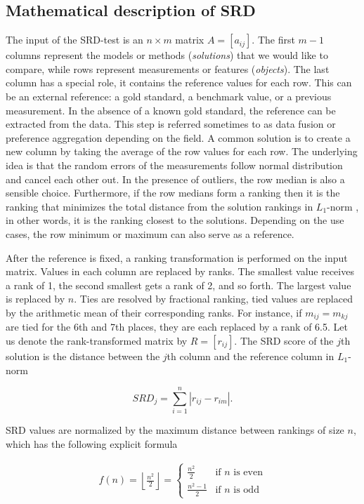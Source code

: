 \subsection{Mathematical description of SRD} \label{sec:SRD_math}

The input of the SRD-test is an $n\times m$ matrix $A=[a_{ij}]$. The first $m-1$ columns represent the models or methods (\emph{solutions}) that we would like to compare, while rows represent measurements or features (\emph{objects}). The last column has a special role, it contains the reference values for each row. This can be an external reference: a gold standard, a benchmark value, or a previous measurement. In the absence of a known gold standard, the reference can be extracted from the data. This step is referred sometimes to as data fusion or preference aggregation depending on the field. A common solution is to create a new column by taking the average of the row values for each row. The underlying idea is that the random errors of the measurements follow normal distribution and cancel each other out. In the presence of outliers, the row median is also a sensible choice. Furthermore, if the row medians form a ranking then it is the ranking that minimizes the total distance from the solution rankings in $L_1$-norm \citep{Dwork2002}, in other words, it is the ranking closest to the solutions. Depending on the use cases, the row minimum or maximum can also serve as a reference.

After the reference is fixed, a ranking transformation is performed on the input matrix. Values in each column are replaced by ranks. The smallest value receives a rank of 1, the second smallest gets a rank of 2, and so forth. The largest value is replaced by $n$. Ties are resolved by fractional ranking, tied values are replaced by the arithmetic mean of their corresponding ranks. For instance, if $m_{ij}=m_{kj}$ are tied for the 6th and 7th places, they are each replaced by a rank of 6.5. Let us denote the rank-transformed matrix by $R=[r_{ij}]$. The SRD score of the $j$th solution is the distance between the $j$th column and the reference column in $L_1$-norm

$$SRD_j=\sum_{i=1}^n |r_{ij} - r_{im}|.$$

SRD values are normalized by the maximum distance between rankings of size $n$, which has the following explicit formula

\begin{gather}f(n) = \left\lfloor\frac{n^2}{2}\right\rfloor =
\begin{cases}
\frac{n^2}{2} & \mbox{if } n \mbox{ is even} \label{eq:normalization}\\
\frac{n^2-1}{2} & \mbox{if } n \mbox{ is odd}
\end{cases}\end{gather}

